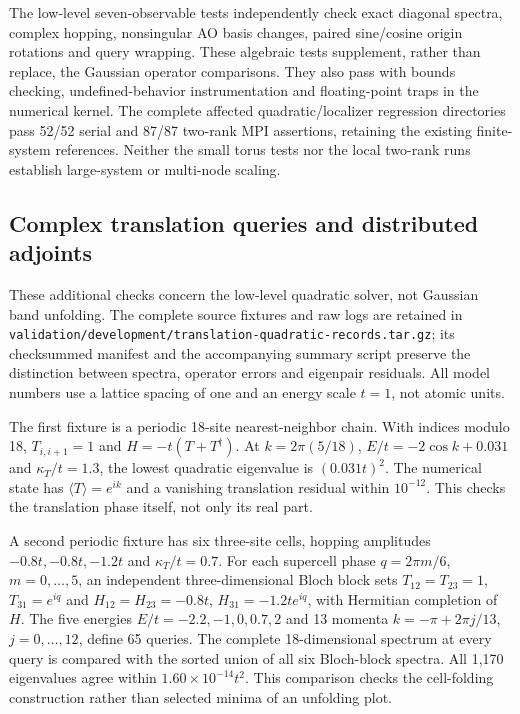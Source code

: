 \documentclass[11pt]{article}
\begin{document}
The low-level seven-observable tests independently check exact
diagonal spectra, complex hopping, nonsingular AO basis changes,
paired sine/cosine origin rotations and query wrapping. These
algebraic tests supplement, rather than replace, the Gaussian
operator comparisons. They also pass with bounds checking,
undefined-behavior instrumentation and floating-point traps in
the numerical kernel. The complete affected quadratic/localizer
regression directories pass 52/52 serial and 87/87 two-rank MPI
assertions, retaining the existing finite-system references.
Neither the small torus tests nor the local
two-rank runs establish large-system or multi-node scaling.

\subsection{Complex translation queries and distributed adjoints}
\label{sec:si-translation-quadratic}
These additional checks concern the low-level quadratic solver,
not Gaussian band unfolding. The complete source fixtures and
raw logs are retained in
\nolinkurl{validation/development/translation-quadratic-records.tar.gz};
its checksummed manifest and the accompanying summary script
preserve the distinction between spectra, operator errors and
eigenpair residuals. All model numbers use a lattice spacing
of one and an energy scale $t=1$, not atomic units.

The first fixture is a periodic 18-site nearest-neighbor chain.
With indices modulo 18, $T_{i,i+1}=1$ and
$H=-t(T+T^\dagger)$. At $k=2\pi(5/18)$,
$E/t=-2\cos k+0.031$ and $\kappa_T/t=1.3$,
the lowest quadratic eigenvalue is $(0.031t)^2$.
The numerical state has $\langle T\rangle=e^{ik}$ and a
vanishing translation residual within $10^{-12}$.
This checks the translation phase itself, not only its real part.

A second periodic fixture has six three-site cells, hopping
amplitudes $-0.8t,-0.8t,-1.2t$ and
$\kappa_T/t=0.7$. For each supercell phase
$q=2\pi m/6$, $m=0,\ldots,5$, an independent three-dimensional
Bloch block sets $T_{12}=T_{23}=1$, $T_{31}=e^{iq}$ and
$H_{12}=H_{23}=-0.8t$, $H_{31}=-1.2te^{iq}$, with Hermitian
completion of $H$. The five energies
$E/t=-2.2,-1,0,0.7,2$ and 13 momenta
$k=-\pi+2\pi j/13$, $j=0,\ldots,12$, define 65 queries.
The complete 18-dimensional spectrum at every query is
compared with the sorted union of all six Bloch-block spectra.
All 1,170 eigenvalues agree within $1.60\times10^{-14}t^2$.
This comparison checks the cell-folding construction rather
than selected minima of an unfolding plot.
\end{document}
